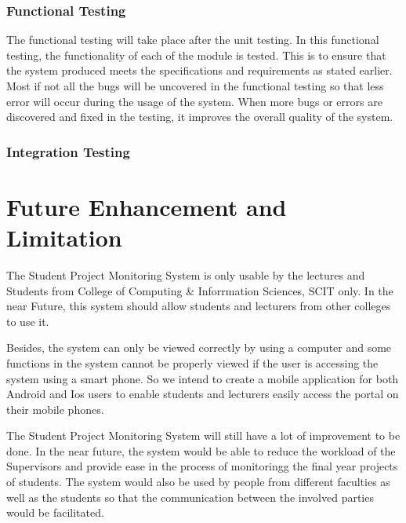 \documentclass{article}
\begin{document}
\subsubsection{Functional Testing}
\par The functional testing will take place after the unit testing. In this functional testing, the functionality of each of the module is tested. This is to ensure that the system produced meets the specifications and requirements as stated earlier. Most if not all the bugs will be uncovered in the functional testing so that less error will occur during the usage of the system. When more bugs or errors are discovered and fixed in the testing, it improves the overall quality of the system.
\subsubsection{Integration Testing}
\section{Future Enhancement and Limitation}
\par The Student Project Monitoring System is only usable by the lectures and  Students from  College of Computing \& Inforrmation Sciences, SCIT only. In the near Future, this system should allow students and lecturers from other colleges to use it.
\vspace*{8mm}
\par  Besides, the system can only be viewed correctly by using a computer and some functions in the system cannot be properly viewed  if the user is accessing the system using a smart phone. So we intend to create a mobile application for both Android and Ios users to enable students and lecturers easily access the portal on their mobile phones.
\vspace*{8mm}
\par The Student Project Monitoring System  will still have a lot of improvement to be done. In the near future, the system would be able to reduce the workload of the Supervisors and provide ease in  the process of monitoringg the final year projects of students. The system would also be used by people from different faculties as well as the students so that the communication between the involved parties would be facilitated.
\end{document}
